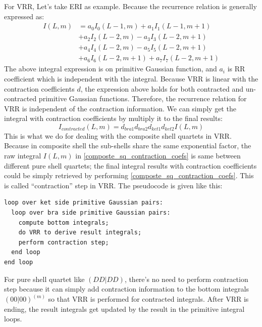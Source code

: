 For VRR, Let's take ERI as example. Because the recurrence relation 
is generally expressed as: 
\begin{align}
I(L,m) &= a_{0}I_{0}(L-1,m) + a_{1}I_{1}(L-1,m+1) \nonumber \\ 
&+ a_{2}I_{2}(L-2,m) - a_{3}I_{3}(L-2,m+1) \nonumber \\
&+ a_{4}I_{4}(L-2,m) - a_{5}I_{5}(L-2,m+1) \nonumber \\
&+ a_{6}I_{6}(L-2,m+1) + a_{7}I_{7}(L-2,m+1)
\end{align}
The above integral expression is on primitive Gaussian function, and 
$a_{i}$ is RR coefficient which is independent with the integral.
Because VRR is linear with the contraction coefficients $d$,
the expression above holds for both contracted and un-contracted primitive
Gaussian functions. Therefore, the recurrence relation for VRR is 
independent of the contraction information. We can simply get the 
integral with contraction coefficients by multiply it to the final
results:
\begin{equation}\label{composte_sq_contraction_coefs}
 I_{contracted}(L,m) = d_{bra1}d_{bra2}d_{ket1}d_{ket2}I(L,m)
\end{equation}
This is what we do for dealing with the composite shell quartets in VRR.
Because in composite shell the sub-shells share the same exponential
factor, the raw integral $I(L,m)$ in \ref{composte_sq_contraction_coefs} 
is same between different pure shell quartets; the final integral results
with contraction coefficients could be simply retrieved by performing 
\ref{composte_sq_contraction_coefs}. This is called ``contraction'' step
in VRR. The pseudocode is given like this:
\begin{verbatim}
loop over ket side primitive Gaussian pairs:
  loop over bra side primitive Gaussian pairs:
    compute bottom integrals;
    do VRR to derive result integrals;
    perform contraction step; 
  end loop
end loop
\end{verbatim}
For pure shell quartet like $(DD|DD)$, there's no need to perform 
contraction step because it can simply add contraction information
to the bottom integrals $(00|00)^{(m)}$ so that VRR is performed 
for contracted integrals. After VRR is ending, the result integrals
get updated by the result in the primitive integral loops.

